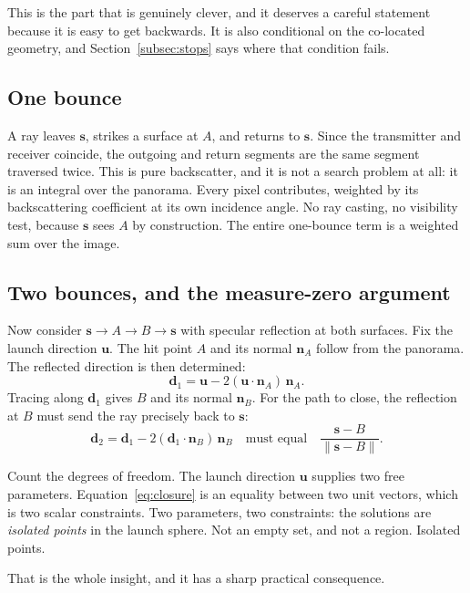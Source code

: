 \documentclass[11pt,a4paper]{article}
\newcommand{\bs}{\mathbf{s}}
\newcommand{\bu}{\mathbf{u}}
\newcommand{\bn}{\mathbf{n}}
\newcommand{\bd}{\mathbf{d}}
\begin{document}
This is the part that is genuinely clever, and it deserves a careful statement
because it is easy to get backwards. It is also conditional on the co-located
geometry, and Section~\ref{subsec:stops} says where that condition fails.

\subsection{One bounce}

A ray leaves $\bs$, strikes a surface at $A$, and returns to $\bs$. Since the
transmitter and receiver coincide, the outgoing and return segments are the same
segment traversed twice. This is pure backscatter, and it is not a search problem
at all: it is an integral over the panorama. Every pixel contributes, weighted by
its backscattering coefficient at its own incidence angle. No ray casting, no
visibility test, because $\bs$ sees $A$ by construction. The entire one-bounce
term is a weighted sum over the image.

\subsection{Two bounces, and the measure-zero argument}

Now consider $\bs \to A \to B \to \bs$ with specular reflection at both surfaces.
Fix the launch direction $\bu$. The hit point $A$ and its normal $\bn_A$ follow
from the panorama. The reflected direction is then determined:
\begin{equation}
  \bd_1 = \bu - 2(\bu\cdot\bn_A)\,\bn_A .
\end{equation}
Tracing along $\bd_1$ gives $B$ and its normal $\bn_B$. For the path to close,
the reflection at $B$ must send the ray precisely back to $\bs$:
\begin{equation}
  \bd_2 = \bd_1 - 2(\bd_1\cdot\bn_B)\,\bn_B
  \quad\text{must equal}\quad
  \frac{\bs - B}{\lVert \bs - B\rVert} .
  \label{eq:closure}
\end{equation}

Count the degrees of freedom. The launch direction $\bu$ supplies two free
parameters. Equation~\eqref{eq:closure} is an equality between two unit vectors,
which is two scalar constraints. Two parameters, two constraints: the solutions
are \emph{isolated points} in the launch sphere. Not an empty set, and not a
region. Isolated points.

That is the whole insight, and it has a sharp practical consequence.
\end{document}
